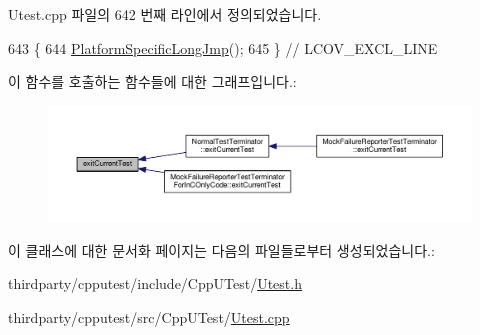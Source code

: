 Utest.\+cpp 파일의 642 번째 라인에서 정의되었습니다.


\begin{DoxyCode}
643 \{
644     \hyperlink{_platform_specific_functions__c_8h_a913f2d60dc37d417bc6d7a55203aa1c1}{PlatformSpecificLongJmp}();
645 \} \textcolor{comment}{// LCOV\_EXCL\_LINE}
\end{DoxyCode}


이 함수를 호출하는 함수들에 대한 그래프입니다.\+:
\nopagebreak
\begin{figure}[H]
\begin{center}
\leavevmode
\includegraphics[width=350pt]{class_test_terminator_without_exceptions_aea055d15b583b4c75114d737d94d2f53_icgraph}
\end{center}
\end{figure}




이 클래스에 대한 문서화 페이지는 다음의 파일들로부터 생성되었습니다.\+:\begin{DoxyCompactItemize}
\item 
thirdparty/cpputest/include/\+Cpp\+U\+Test/\hyperlink{_utest_8h}{Utest.\+h}\item 
thirdparty/cpputest/src/\+Cpp\+U\+Test/\hyperlink{_utest_8cpp}{Utest.\+cpp}\end{DoxyCompactItemize}
